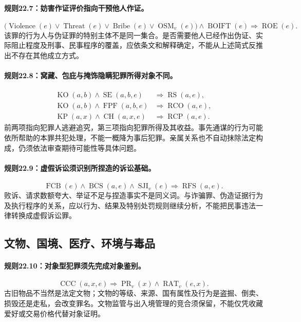 \paragraph{规则22.7：妨害作证评价指向干预他人作证。}
\[
\bigl(\operatorname{Violence}(e)\lor\operatorname{Threat}(e)
\lor\operatorname{Bribe}(e)\lor\operatorname{OSM}_v(e)\bigr)
\land\operatorname{BOIFT}(e)
\Rightarrow\operatorname{ROE}(e).
\]
该罪的行为人与伪证罪的特别主体不是同一集合。是否需要他人已经作出伪证、实际阻止程度及刑事、民事程序的覆盖，应依条文和解释确定，不能从上述简式反推出不存在其他成立方式。

\paragraph{规则22.8：窝藏、包庇与掩饰隐瞒犯罪所得对象不同。}
\[
\begin{aligned}
\operatorname{KO}(a,b)\land\operatorname{SE}(a,b,e)
&\Rightarrow\operatorname{RS}(a,e),\\
\operatorname{KO}(a,b)\land\operatorname{FPF}(a,b,e)
&\Rightarrow\operatorname{RCO}(a,e),\\
\operatorname{KP}(a,x)\land\operatorname{CH}(a,x,e)
&\Rightarrow\operatorname{RCP}(a,e).
\end{aligned}
\]
前两项指向犯罪人逃避追究，第三项指向犯罪所得及其收益。事先通谋的行为可能依所帮助的本罪共犯处理，不能一概降为事后犯罪。亲属关系也不自动抹除法定构成，仍须依法审查期待可能性等具体问题。

\paragraph{规则22.9：虚假诉讼须识别所捏造的诉讼基础。}
\[
\operatorname{FCB}(e)\land\operatorname{BCS}(a,e)
\land\operatorname{SJI}_v(e)
\Rightarrow\operatorname{RFS}(a,e).
\]
败诉、请求数额夸大、举证不足与捏造事实不是同义词。与诈骗罪、伪造证据行为及执行程序的关系，应以行为、结果及特别处罚规则继续分析，不能把民事违法一律转换成虚假诉讼罪。

\subsection{文物、国境、医疗、环境与毒品}
\paragraph{规则22.10：对象型犯罪须先完成对象鉴别。}
\[
\operatorname{CCC}(a,x,e)
\Rightarrow\operatorname{PR}_v(x)
\land\operatorname{RAT}_v(e,x).
\]
古旧物品不当然是法定文物；文物的等级、来源、国有属性及行为是盗掘、倒卖、损毁还是走私，会改变罪名。文物监管与出入境管理的竞合须保留，不能仅凭收藏爱好或交易价格代替对象证明。

